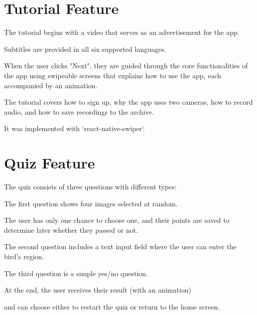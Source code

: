 \section{Tutorial Feature}

The tutorial begins with a video that serves as an advertisement for the app.

Subtitles are provided in all six supported languages.

When the user clicks "Next", they are guided through the core functionalities of the app using swipeable screens that explains how to use the app, each accompanied by an animation.

The tutorial covers how to sign up, why the app uses two cameras, how to record audio, and how to save recordings to the archive.

It was implemented with `react-native-swiper`.


\section{Quiz Feature}

The quiz consists of three questions with different types:

The first question shows four images selected at random. 

The user has only one chance to choose one, and their points are saved to determine later whether they passed or not.

The second question includes a text input field where the user can enter the bird’s region.

The third question is a simple yes/no question.

At the end, the user receives their result (with an animation) 

and can choose either to restart the quiz or return to the home screen.